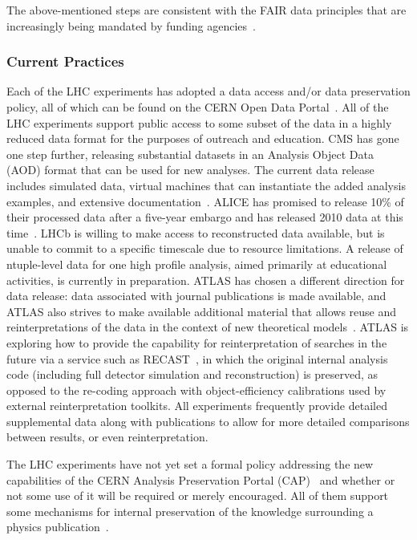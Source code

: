 The above-mentioned steps are consistent with the
FAIR data principles that are increasingly being mandated by funding
agencies~\cite{FAIRdata}.

\subsubsection*{Current Practices}

Each of the LHC experiments has adopted a data access and/or data
preservation policy, all of which can be found on the CERN Open Data
Portal~\cite{ODP}. All of the LHC experiments support public access to
some subset of the data in a highly reduced data format for the purposes
of outreach and education. CMS has gone one step further, releasing
substantial datasets in an Analysis Object Data (AOD) format that can be
used for new analyses. The current data release includes simulated data,
virtual machines that can instantiate the added analysis examples, and
extensive documentation~\cite{CMS-OpenData}. ALICE has promised to
release 10\% of their processed data after a five-year embargo and has
released 2010 data at this time~\cite{ALICE-OpenData}.
LHCb is willing to make access to reconstructed data available, but is
unable to commit to a specific timescale due to resource limitations. A
release of ntuple-level data for one high profile analysis, aimed
primarily at educational activities, is currently in preparation. ATLAS
has chosen a different direction for data release: data associated with
journal publications is made available, and ATLAS also strives to make
available additional material that allows reuse and reinterpretations of
the data in the context of new theoretical models~\cite{ATL-CB-PUB-2015-001}.
ATLAS is  exploring how
to provide the capability for reinterpretation of searches in the future
via a service such as
RECAST~\cite{Cranmer:1299950}, in which the original internal analysis
code (including full detector simulation and reconstruction) is
preserved, as opposed to the re-coding approach with object-efficiency
calibrations used by external reinterpretation toolkits. All experiments
frequently provide detailed supplemental data along with publications to
allow for more detailed comparisons between results, or even
reinterpretation.

The LHC experiments have not yet set a formal policy addressing the new
capabilities of the CERN Analysis Preservation Portal (CAP)~\cite{CAP}
and whether or not some use of it will be required or merely encouraged.
All of them support some mechanisms for internal preservation of the
knowledge surrounding a physics publication~\cite{Shiers2017}.

